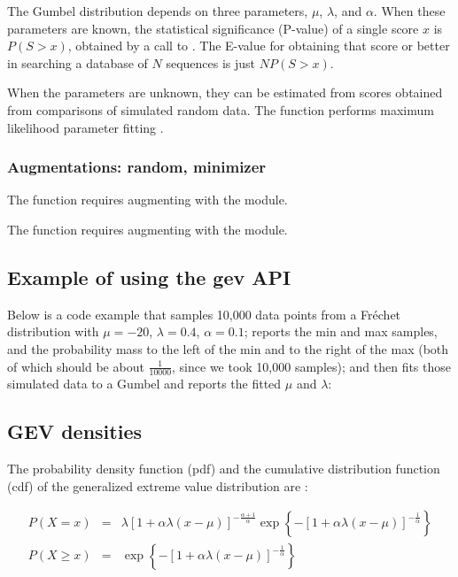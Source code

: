 The Gumbel distribution depends on three parameters, $\mu$, $\lambda$,
and $\alpha$. When these parameters are known, the statistical
significance (P-value) of a single score $x$ is $P(S>x)$, obtained by
a call to .  The E-value for obtaining that
score or better in searching a database of $N$ sequences is just
$NP(S>x)$.

When the parameters are unknown, they can be estimated from scores
obtained from comparisons of simulated random data. The
 function performs maximum likelihood
parameter fitting \citep{Coles01}.

\subsubsection{Augmentations: random, minimizer}

The  function requires augmenting with the
 module.

The  function requires augmenting with
the  module.

\subsection{Example of using the gev API}

Below is a code example that samples 10,000 data points from a
Fr\'{e}chet distribution with $\mu=-20$, $\lambda=0.4$, $\alpha=0.1$;
reports the min and max samples, and the probability mass to the left
of the min and to the right of the max (both of which should be about
$\frac{1}{10000}$, since we took 10,000 samples); and then fits those
simulated data to a Gumbel and reports the fitted $\mu$ and $\lambda$:



\subsection{GEV densities}

The probability density function (pdf) and the cumulative distribution
function (cdf) of the generalized extreme value distribution are
\citep{Coles01}:

\begin{eqnarray}
P(X=x) & = & \lambda \left[ 1 + \alpha \lambda (x - \mu) \right]^{-\frac{\alpha+1}{\alpha}}
       \exp \left\{ - \left[ 1 + \alpha \lambda (x - \mu)
       \right]^{-\frac{1}{\alpha}} \right\} 
\\%
\label{eqn:gev_density}
P(X \geq x) & = & \exp \left\{ - \left[ 1 +
     \alpha\lambda(x-\mu) \right]^{-\frac{1}{\alpha}} \right\} 
\\%
\label{eqn:gev_distribution}
\end{eqnarray}

